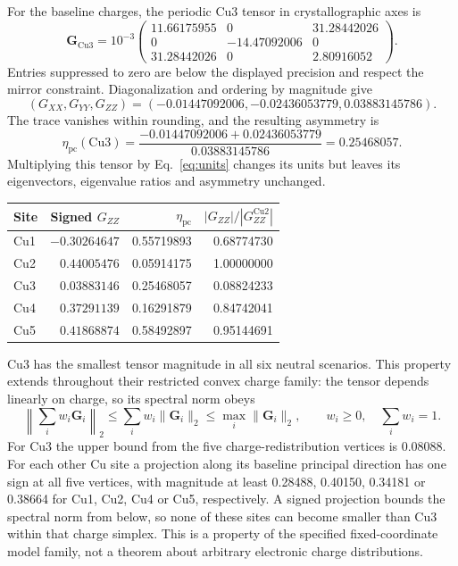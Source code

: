 \documentclass[11pt,a4paper]{article}
\newcommand{\G}{\bm G}
\newcommand{\etapc}{\eta_{\mathrm{pc}}}
\begin{document}
For the baseline charges, the periodic Cu3 tensor in crystallographic axes is
\begin{equation}
 \G_{\mathrm{Cu3}}=10^{-3}
 \begin{pmatrix}
 11.66175955&0&31.28442026\\
 0&-14.47092006&0\\
 31.28442026&0&2.80916052
 \end{pmatrix}.
\end{equation}
Entries suppressed to zero are below the displayed precision and respect the
mirror constraint. Diagonalization and ordering by magnitude give
\begin{equation}
 (G_{XX},G_{YY},G_{ZZ})
 =(-0.01447092006,-0.02436053779,0.03883145786).
\end{equation}
The trace vanishes within rounding, and the resulting asymmetry is
\begin{equation}
 \etapc(\mathrm{Cu3})=
 \frac{-0.01447092006+0.02436053779}{0.03883145786}
 =0.25468057.
\end{equation}
Multiplying this tensor by Eq.~\eqref{eq:units} changes its units but leaves its
eigenvectors, eigenvalue ratios and asymmetry unchanged.

\begin{center}
\begin{tabular}{lrrr}
\toprule
Site & Signed $G_{ZZ}$ & $\etapc$ & $|G_{ZZ}|/|G_{ZZ}^{\mathrm{Cu2}}|$\\
\midrule
Cu1 & $-0.30264647$ & 0.55719893 & 0.68774730 \\
Cu2 & $ 0.44005476$ & 0.05914175 & 1.00000000 \\
Cu3 & $ 0.03883146$ & 0.25468057 & 0.08824233 \\
Cu4 & $ 0.37291139$ & 0.16291879 & 0.84742041 \\
Cu5 & $ 0.41868874$ & 0.58492897 & 0.95144691 \\
\bottomrule
\end{tabular}
\end{center}

Cu3 has the smallest tensor magnitude in all six neutral scenarios. This
property extends throughout their restricted convex charge family: the tensor
depends linearly on charge, so its spectral norm obeys
\begin{equation}
 \left\|\sum_iw_i\G_i\right\|_2
 \leq\sum_iw_i\|\G_i\|_2
 \leq\max_i\|\G_i\|_2,\qquad w_i\geq0,\quad\sum_iw_i=1.
\end{equation}
For Cu3 the upper bound from the five charge-redistribution vertices is 0.08088.
For each other Cu site a projection along its baseline principal direction has
one sign at all five vertices, with magnitude at least 0.28488, 0.40150, 0.34181
or 0.38664 for Cu1, Cu2, Cu4 or Cu5, respectively. A signed projection bounds the
spectral norm from below, so none of these sites can become smaller than Cu3
within that charge simplex. This is a property of the specified fixed-coordinate
model family, not a theorem about arbitrary electronic charge distributions.
\end{document}
